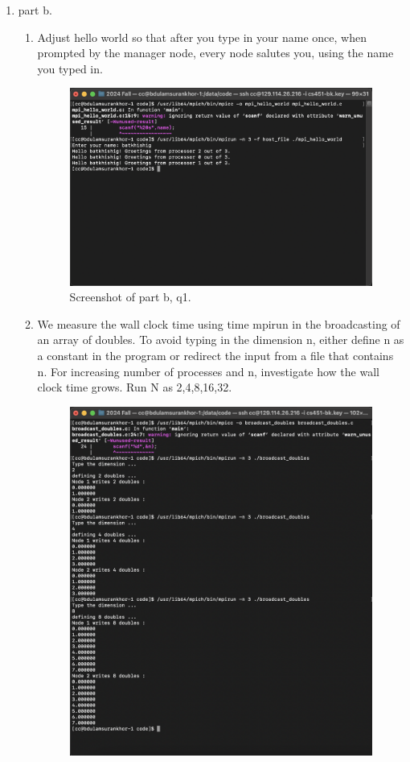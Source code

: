 \documentclass{article}
\begin{document}
\begin{enumerate}
\begin{enumerate}
    \item part b.
    \begin{enumerate}
      \item Adjust hello world so that after you type in your name once, when prompted by the manager node, every node salutes you, using the name you typed in.
      \begin{figure}[H]
        \centering
        \includegraphics[width=\textwidth]{image3.png}
        \caption{Screenshot of part b, q1.}
      \end{figure}
      \item We measure the wall clock time using time mpirun in the broadcasting of an array of doubles.
      To avoid typing in the dimension n, either define n as a constant in the program or redirect the input from a file that contains n.
      For increasing number of processes and n, investigate how the wall clock time grows. Run N as 2,4,8,16,32.
      \begin{figure}[H]
        \centering
        \includegraphics[width=\textwidth]{image4.png}

\end{figure}
\end{enumerate}
\end{enumerate}
\end{enumerate}
\end{document}
